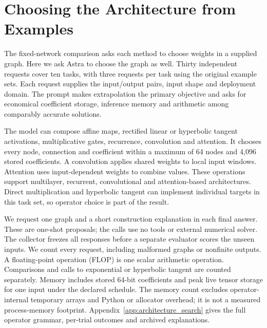 \section{Choosing the Architecture from Examples}\label{sec:free-architecture}
The fixed-network comparison asks each method to choose weights in a supplied graph. Here we ask Astra to choose the graph as well. Thirty independent requests cover ten tasks, with three requests per task using the original example sets. Each request supplies the input/output pairs, input shape and deployment domain. The prompt makes extrapolation the primary objective and asks for economical coefficient storage, inference memory and arithmetic among comparably accurate solutions.

The model can compose affine maps, rectified linear or hyperbolic tangent activations, multiplicative gates, recurrence, convolution and attention. It chooses every node, connection and coefficient within a maximum of 64 nodes and 4,096 stored coefficients. A convolution applies shared weights to local input windows. Attention uses input-dependent weights to combine values. These operations support multilayer, recurrent, convolutional and attention-based architectures. Direct multiplication and hyperbolic tangent can implement individual targets in this task set, so operator choice is part of the result.

We request one graph and a short construction explanation in each final answer. These are one-shot proposals; the calls use no tools or external numerical solver. The collector freezes all responses before a separate evaluator scores the unseen inputs. We count every request, including malformed graphs or nonfinite outputs. A floating-point operation (FLOP) is one scalar arithmetic operation. Comparisons and calls to exponential or hyperbolic tangent are counted separately. Memory includes stored 64-bit coefficients and peak live tensor storage for one input under the declared schedule. The memory count excludes operator-internal temporary arrays and Python or allocator overhead; it is not a measured process-memory footprint. Appendix~\ref{app:architecture_search} gives the full operator grammar, per-trial outcomes and archived explanations.


